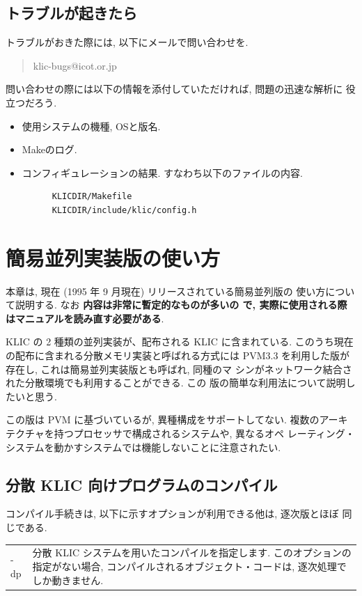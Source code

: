 \documentclass[a4,titlepage]{jsreport}
\begin{document}
\section{トラブルが起きたら}
トラブルがおきた際には, 以下にメールで問い合わせを.  

\begin{quotation}
klic-bugs@icot.or.jp
\end{quotation}

問い合わせの際には以下の情報を添付していただければ, 問題の迅速な解析に
役立つだろう.
\begin{itemize}
\item
使用システムの機種, OSと版名.
\item
Makeのログ.
\item
コンフィギュレーションの結果. すなわち以下のファイルの内容.
\begin{verbatim}
      KLICDIR/Makefile
      KLICDIR/include/klic/config.h
\end{verbatim}
\end{itemize}


\appendix
\chapter{簡易並列実装版の使い方}
本章は, 現在 (1995 年 9 月現在) リリースされている簡易並列版の
使い方について説明する.  なお {\bf 内容は非常に暫定的なものが多いの
で, 実際に使用される際はマニュアルを読み直す必要がある}.

KLIC の 2 種類の並列実装が、配布される KLIC に含まれている.  
このうち現在の配布に含まれる分散メモリ実装と呼ばれる方式には
PVM3.3 を利用した版が存在し, これは簡易並列実装版とも呼ばれ, 同種のマ
シンがネットワーク結合された分散環境でも利用することができる.  この
版の簡単な利用法について説明したいと思う.

この版は PVM に基づいているが, 異種構成をサポートしてない.  
複数のアーキテクチャを持つプロセッサで構成されるシステムや, 異なるオペ
レーティング・システムを動かすシステムでは機能しないことに注意されたい.

\section{分散 KLIC 向けプログラムのコンパイル}
コンパイル手続きは, 以下に示すオプションが利用できる他は, 逐次版とほぼ
同じである.  

\begin{tabular}{lp{10cm}}
-dp&
分散 KLIC システムを用いたコンパイルを指定します.  
このオプションの指定がない場合, コンパイルされるオブジェクト・コードは, 
逐次処理でしか動きません. \\
\end{tabular}
\end{document}
